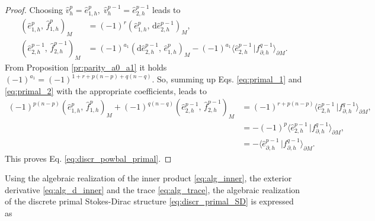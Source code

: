 \documentclass{elsarticle}
\renewcommand\d{\ensuremath{\mathrm{d}}}
\newcommand*{\dual}[1]{\ensuremath{\widehat{#1}}}
\newcommand{\inpr}[3][]{\ensuremath{( #2, \, #3 )_{#1}}}
\newcommand{\dualpr}[3][]{\ensuremath{\langle #2 \, \vert #3 \rangle_{#1}}}
\begin{document}
{\begin{proof}
Choosing $\dual{v}^p_h = \dual{e}^p_{1, h}, \; \dual{v}^{p-1}_h = \dual{e}^{p-1}_{2, h}$ leads to 
\begin{align}
      \inpr[M]{\dual{e}^p_{1, h}}{\dual{f}^p_{1, h}} &= (-1)^r \inpr[M]{\dual{e}^p_{1, h}}{\d \dual{e}^{p-1}_{2, h}}, \label{eq:primal_1}\\
      \inpr[M]{\dual{e}^{p-1}_{2, h}}{\dual{f}^{p-1}_{2, h}} &=(-1)^{a_1} \inpr[M]{\d \dual{e}^{p-1}_{2, h}}{\dual{e}^p_{1, h}} - (-1)^{a_1}\dualpr[\partial M]{\dual{e}_{2, h}^{p-1}}{f_{\partial, h}^{q-1}}. \label{eq:primal_2}
\end{align}
From Proposition \ref{pr:parity_a0_a1} it holds $(-1)^{a_1} = (-1)^{1+r+p(n-p)+q(n-q)}$. So, summing up Eqs. \eqref{eq:primal_1} and \eqref{eq:primal_2} with the appropriate coefficients, leads to
\begin{equation}
\begin{aligned}
    (-1)^{p(n-p)} \inpr[M]{\dual{e}^p_{1, h}}{\dual{f}^p_{1, h}} + (-1)^{q(n-q)} \inpr[M]{\dual{e}^{p-1}_{2, h}}{\dual{f}^{p-1}_{2, h}} &= (-1)^{r+p(n-p)}\dualpr[\partial M]{\dual{e}_{2, h}^{p-1}}{f^{q-1}_{\partial, h}}, \\
    &= -(-1)^{p}\dualpr[\partial M]{\dual{e}_{2, h}^{p-1}}{f^{q-1}_{\partial, h}}, \\
    &= -\dualpr[\partial M]{\dual{e}_{\partial, h}^{p-1}}{f^{q-1}_{\partial, h}}.
\end{aligned}
\end{equation}
This proves Eq. \eqref{eq:discr_powbal_primal}.
\end{proof}

Using the algebraic realization  of the inner product \eqref{eq:alg_inner}, the exterior derivative \eqref{eq:alg_d_inner} and the trace \eqref{eq:alg_trace}, the algebraic realization of the discrete primal Stokes-Dirac structure \eqref{eq:discr_primal_SD} is expressed as

}
\end{document}
